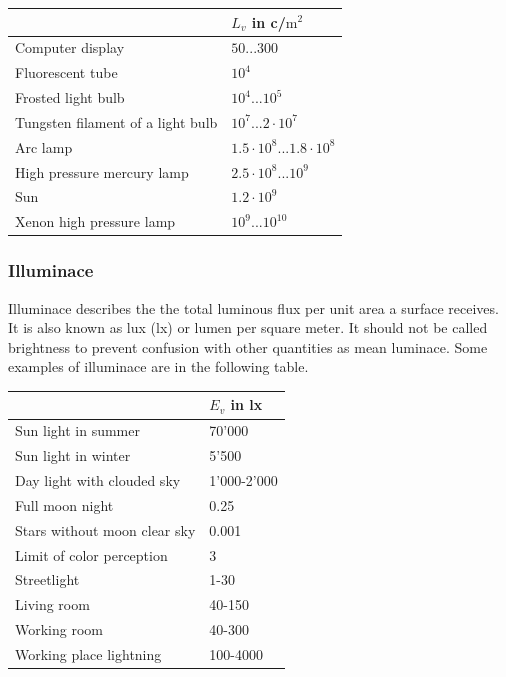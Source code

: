 \begin{tabular}{ |p{11cm} p{3cm}|  }
		\hline
		& $L_v$ in c/$\text{m}^2$\\
		
		
		\hline
		Computer display					& $50...300$\\
		Fluorescent tube					& $10^4$\\
		Frosted light bulb					& $10^4...10^5$\\
		Tungsten filament of a light bulb	& $10^7...2\cdot 10^7$\\
		Arc lamp							& $1.5\cdot10^8...1.8\cdot10^8$\\
		High pressure mercury lamp			& $2.5\cdot10^8...10^9$\\
		Sun									& $1.2\cdot10^9$\\
		Xenon high pressure lamp			& $10^9...10^10$\\
		
		\hline
\end{tabular}




\subsubsection{Illuminace}
Illuminace describes the the total luminous flux per unit area a surface receives. It is also known as lux (lx) or lumen per square meter. It should not be called brightness to prevent confusion with other quantities as mean luminace. Some examples of illuminace are in the following table.\\

\begin{tabular}{ |p{11cm} p{3cm}|  }
		\hline
		& $E_v$ in lx\\
		
		
		\hline
		Sun light in summer					& 70'000\\
		Sun light in winter					& 5'500\\
		Day light with clouded sky			& 1'000-2'000\\
		Full moon night						& 0.25\\
		Stars without moon clear sky		& 0.001\\
		Limit of color perception			& 3\\
		Streetlight							& 1-30\\
		Living room							& 40-150\\
		Working room						& 40-300\\
		Working place lightning				& 100-4000\\
		
		\hline
\end{tabular}



